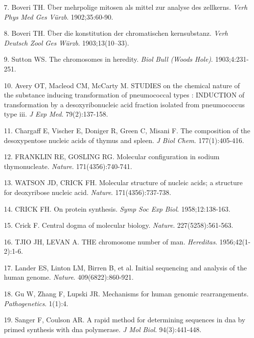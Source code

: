 \documentclass[11pt,letterpaper]{book}
\begin{document}
\leavevmode\hypertarget{ref-boveri:1902aa}{}%
7. Boveri TH. Über mehrpolige mitosen als mittel zur analyse des zellkerns. \emph{Verh Phys Med Ges Vürzb}. 1902;35:60-90.

\leavevmode\hypertarget{ref-boveri:1903aa}{}%
8. Boveri TH. Über die konstitution der chromatischen kernsubstanz. \emph{Verh Deutsch Zool Ges Würzb}. 1903;13(10--33).

\leavevmode\hypertarget{ref-sutton:1903aa}{}%
9. Sutton WS. The chromosomes in heredity. \emph{Biol Bull (Woods Hole)}. 1903;4:231-251.

\leavevmode\hypertarget{ref-avery:1944aa}{}%
10. Avery OT, Macleod CM, McCarty M. STUDIES on the chemical nature of the substance inducing transformation of pneumococcal types : INDUCTION of transformation by a desoxyribonucleic acid fraction isolated from pneumococcus type iii. \emph{J Exp Med}. 79(2):137-158.

\leavevmode\hypertarget{ref-chargaff:1949aa}{}%
11. Chargaff E, Vischer E, Doniger R, Green C, Misani F. The composition of the desoxypentose nucleic acids of thymus and spleen. \emph{J Biol Chem}. 177(1):405-416.

\leavevmode\hypertarget{ref-franklin:1953aa}{}%
12. FRANKLIN RE, GOSLING RG. Molecular configuration in sodium thymonucleate. \emph{Nature}. 171(4356):740-741.

\leavevmode\hypertarget{ref-watson:1953aa}{}%
13. WATSON JD, CRICK FH. Molecular structure of nucleic acids; a structure for deoxyribose nucleic acid. \emph{Nature}. 171(4356):737-738.

\leavevmode\hypertarget{ref-crick:1958aa}{}%
14. CRICK FH. On protein synthesis. \emph{Symp Soc Exp Biol}. 1958;12:138-163.

\leavevmode\hypertarget{ref-crick:1970aa}{}%
15. Crick F. Central dogma of molecular biology. \emph{Nature}. 227(5258):561-563.

\leavevmode\hypertarget{ref-tjio:1956aa}{}%
16. TJIO JH, LEVAN A. THE chromosome number of man. \emph{Hereditas}. 1956;42(1‐2):1-6.

\leavevmode\hypertarget{ref-lander:2001aa}{}%
17. Lander ES, Linton LM, Birren B, et al. Initial sequencing and analysis of the human genome. \emph{Nature}. 409(6822):860-921.

\leavevmode\hypertarget{ref-gu:2008aa}{}%
18. Gu W, Zhang F, Lupski JR. Mechanisms for human genomic rearrangements. \emph{Pathogenetics}. 1(1):4.

\leavevmode\hypertarget{ref-sanger:1975aa}{}%
19. Sanger F, Coulson AR. A rapid method for determining sequences in dna by primed synthesis with dna polymerase. \emph{J Mol Biol}. 94(3):441-448.
\end{document}
